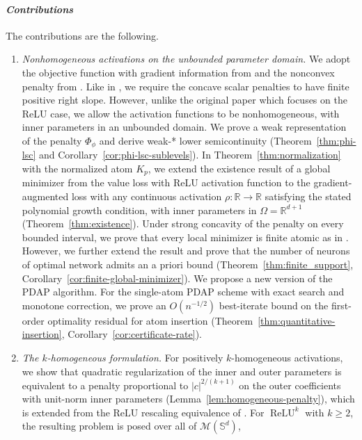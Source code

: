 \documentclass[11pt]{amsart}
\theoremstyle{definition}
\theoremstyle{remark}
\DeclareMathOperator{\relu}{ReLU}
\newcommand{\reluk}{\relu^{k}}
\begin{document}
\paragraph{\emph{Contributions}}
The contributions are the following.
\begin{enumerate}
	\item \emph{Nonhomogeneous activations on the unbounded parameter domain.}
	We adopt the objective function with gradient information from \cite{azmi2021optimal} and the nonconvex penalty from \cite{pieper2022nonconvex}. 
	Like in \cite{pieper2022nonconvex}, we require the concave scalar penalties to have finite positive right slope.
	However, unlike the original paper which focuses on the ReLU case, we allow the activation functions to be nonhomogeneous, with inner parameters in an unbounded domain.
	We prove a weak representation of the penalty $\Phi_\phi$ and derive weak-* lower semicontinuity
	(Theorem~\ref{thm:phi-lsc} and Corollary~\ref{cor:phi-lsc-sublevels}).
	In Theorem~\ref{thm:normalization} with the normalized atom $K_p$,
	we extend the existence result of a global minimizer from the value loss with ReLU activation function
	to the gradient-augmented loss with any continuous activation $\rho:\mathbb R\to\mathbb R$
	satisfying the stated polynomial growth condition, with inner parameters in $\Omega=\mathbb R^{d+1}$ (Theorem~\ref{thm:existence}).
	Under strong concavity of the penalty on every bounded interval,
	we prove that every local minimizer is finite atomic as in \cite{pieper2022nonconvex}.
	However, we further extend the result and prove that the number of neurons of optimal network admits an a priori bound
	(Theorem~\ref{thm:finite_support}, Corollary~\ref{cor:finite-global-minimizer}). 
	We propose a new version of the PDAP algorithm.
	For the single-atom PDAP scheme with exact search and monotone correction,
	we prove an $O(n^{-1/2})$ best-iterate bound on the first-order optimality residual for atom insertion
	(Theorem~\ref{thm:quantitative-insertion}, Corollary~\ref{cor:certificate-rate}).
	\item \emph{The $k$-homogeneous formulation.} 
	For positively $k$-homogeneous activations, we show that quadratic
	regularization of the inner and outer parameters is equivalent to a penalty proportional to
	$|c|^{2/(k+1)}$ on the outer coefficients with unit-norm inner
	parameters (Lemma~\ref{lem:homogeneous-penalty}), 
	which is extended from the ReLU rescaling equivalence of \cite[Appendix~F, Proposition~3]{pieper2022nonconvex}.
	For $\reluk$ with $k\ge2$, the resulting problem is posed over all of $\mathcal M(\mathbb S^d)$,

\end{enumerate}
\end{document}
